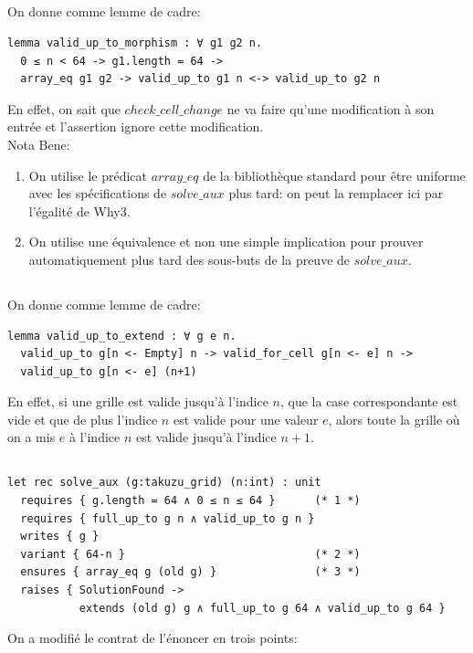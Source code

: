 ﻿\documentclass[10pt,a4paper]{article}
\begin{document}
\subsection{}
\label{q19}
On donne comme \og lemme de cadre\fg{}:
\begin{verbatim}
lemma valid_up_to_morphism : ∀ g1 g2 n.
  0 ≤ n < 64 -> g1.length = 64 ->
  array_eq g1 g2 -> valid_up_to g1 n <-> valid_up_to g2 n
\end{verbatim}

En effet, on sait que $check\_cell\_change$ ne va faire qu'une modification à son entrée et l'assertion ignore cette modification.\\
Nota Bene:
\begin{enumerate}
\item On utilise le prédicat $array\_eq$ de la bibliothèque standard pour être uniforme avec les spécifications de $solve\_aux$ plus tard: on peut la remplacer ici par l'égalité de Why3.
\item On utilise une équivalence et non une simple implication pour prouver automatiquement plus tard des sous-buts de la preuve de $solve\_aux$.
\end{enumerate}

\subsection{}
\label{q20}
On donne comme \og lemme de cadre\fg{}:
\begin{verbatim}
lemma valid_up_to_extend : ∀ g e n.
  valid_up_to g[n <- Empty] n -> valid_for_cell g[n <- e] n ->
  valid_up_to g[n <- e] (n+1)
\end{verbatim}

En effet, si une grille est valide jusqu'à l'indice $n$, que la case correspondante est vide et que de plus l'indice $n$ est valide pour une valeur $e$, alors toute la grille où on a mis $e$ à l'indice $n$ est valide jusqu'à l'indice $n+1$.

\subsection{}
\begin{verbatim}
let rec solve_aux (g:takuzu_grid) (n:int) : unit
  requires { g.length = 64 ∧ 0 ≤ n ≤ 64 }      (* 1 *)
  requires { full_up_to g n ∧ valid_up_to g n }
  writes { g }
  variant { 64-n }                             (* 2 *)
  ensures { array_eq g (old g) }               (* 3 *)
  raises { SolutionFound ->
           extends (old g) g ∧ full_up_to g 64 ∧ valid_up_to g 64 }
\end{verbatim}
On a modifié le contrat de l'énoncer en trois points:
\end{document}
